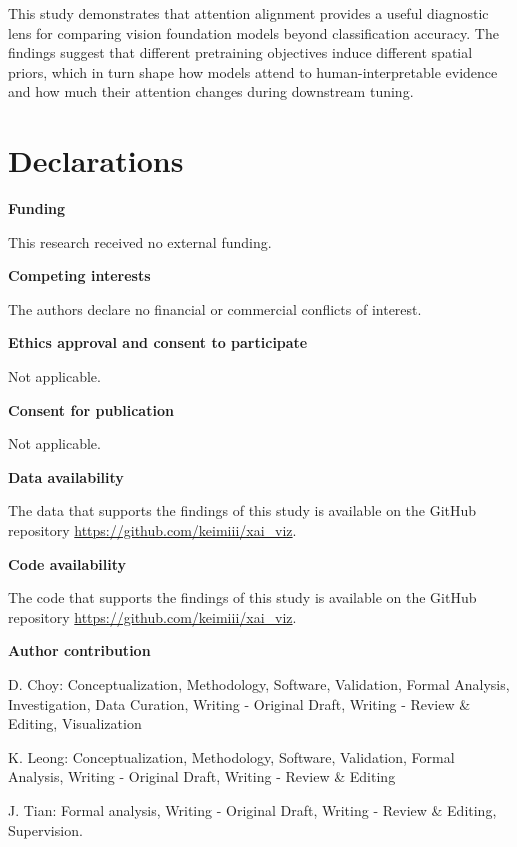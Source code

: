 \documentclass[lineno,pdflatex,sn-mathphys-num]{sn-jnl}%
\theoremstyle{thmstyleone}%
\theoremstyle{thmstyletwo}%
\theoremstyle{thmstylethree}%
\begin{document}
This study demonstrates that attention alignment provides a useful diagnostic lens for comparing vision foundation models beyond classification accuracy. The findings suggest that different pretraining objectives induce different spatial priors, which in turn shape how models attend to human-interpretable evidence and how much their attention changes during downstream tuning. 

\backmatter


\section*{Declarations}

\textbf{Funding}

This research received no external funding. \newline

\noindent\textbf{Competing interests}

The authors declare no financial or commercial conflicts of interest. \newline

\noindent\textbf{Ethics approval and consent to participate}

Not applicable.\newline

\noindent\textbf{Consent for publication}

Not applicable.\newline

\noindent\textbf{Data availability }

The data that supports the findings of this study is available on the GitHub repository \url{https://github.com/keimiii/xai\_viz}.\newline

\noindent\textbf{Code availability }

The code that supports the findings of this study is available on the GitHub repository \url{https://github.com/keimiii/xai\_viz}.\newline

\noindent\textbf{Author contribution}

D. Choy: Conceptualization, Methodology, Software, Validation, Formal Analysis, Investigation, Data Curation, Writing - Original Draft, Writing - Review \& Editing, Visualization

K. Leong: Conceptualization, Methodology, Software, Validation, Formal Analysis, Writing - Original Draft, Writing - Review \& Editing

J. Tian: Formal analysis, Writing - Original Draft, Writing - Review \& Editing, Supervision.
\end{document}
